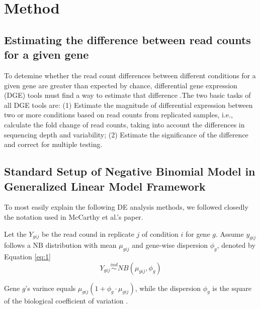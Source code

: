 \chapter{Method}

\section{Estimating the difference between read counts for a given gene}

To detemine whether the read count differences between different conditions for a given gene are greater than expected by chance, differential gene expression (DGE) tools must find a way to estimate that difference \citep{dundar2015introduction}.The two basic tasks of all DGE tools are: (1) Estimate the magnitude of differential expression between two or more conditions based on read counts from replicated samples, i.e., calculate the fold change of read counts, taking into account the differences in sequencing depth and variability; (2) Estimate the significance of the difference and correct for multiple testing. 

\section{Standard Setup of Negative Binomial Model in Generalized Linear Model Framework}

To most easily explain the following DE analysis methods, we followed closedly the notation used in McCarthy et al.'s paper\citep{mccarthy2012differential}.

Let the $Y_{gij}$ be the read cound in replicate $j$ of condition $i$ for gene $g$. Assume $y_{gij}$ follows a NB distribution with mean $\mu_{gij}$ and gene-wise dispersion $\phi_g$, denoted by Equation \eqref{eq:1}
\begin{equation}
\label{eq:1}
Y_{gij} \stackrel{ind}{\sim} NB(\mu_{gij}, \phi_g)
\end{equation}

Gene $g$'s varince equals $\mu_{gij}(1+\phi_g \cdot \mu_{gij})$, while the dispersion $\phi_g$ is the square of the biological coefficient of variation \citep{mccarthy2012differential}. 

